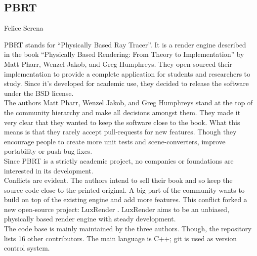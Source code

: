 \subsection{PBRT}{Felice Serena}

PBRT stands for ``Physically Based Ray Tracer''. It is a render engine described in the book ``Physically Based Rendering: From Theory to Implementation'' by Matt Pharr, Wenzel Jakob, and Greg Humphreys. They open-sourced their implementation to provide a complete application for students and researchers to study. Since it's developed for academic use, they decided to release the software under the BSD license. \\

The authors Matt Pharr, Wenzel Jakob, and Greg Humphreys stand at the top of the community hierarchy and make all decisions amongst them. They made it very clear that they wanted to keep the software close to the book. What this means is that they rarely accept pull-requests for new features. Though they encourage people to create more unit tests and scene-converters, improve portability or push bug fixes. \cite{pbrt-pull-requests} \\

Since PBRT is a strictly academic project, no companies or foundations are interested in its development. \\

Conflicts are evident. The authors intend to sell their book and so keep the source code close to the printed original. A big part of the community wants to build on top of the existing engine and add more features. This conflict forked a new open-source project: LuxRender \cite{luxrender-home}. LuxRender aims to be an unbiased, physically based render engine with steady development. \\

The code base is mainly maintained by the three authors. Though, the repository lists 16 other contributors. The main language is C++; git is used as version control system.


